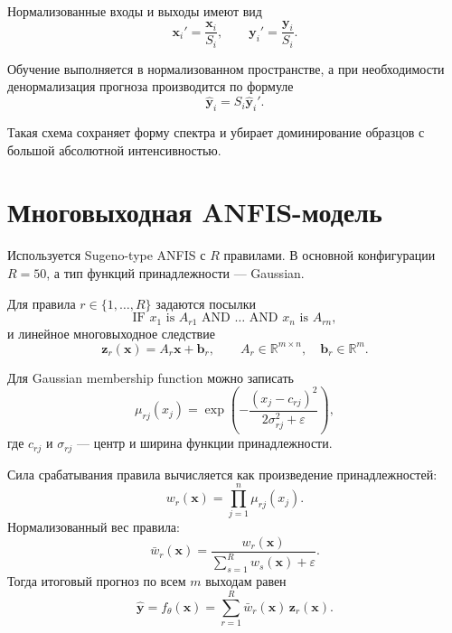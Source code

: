 \documentclass[11pt]{article}
\begin{document}
Нормализованные входы и выходы имеют вид
\begin{equation}
\mathbf{x}_i' = \frac{\mathbf{x}_i}{S_i},
\qquad
\mathbf{y}_i' = \frac{\mathbf{y}_i}{S_i}.
\end{equation}

Обучение выполняется в нормализованном пространстве, а при необходимости денормализация прогноза производится по формуле
\begin{equation}
\hat{\mathbf{y}}_i = S_i \hat{\mathbf{y}}_i'.
\end{equation}

Такая схема сохраняет форму спектра и убирает доминирование образцов с большой абсолютной интенсивностью.

\section{Многовыходная ANFIS-модель}

Используется Sugeno-type ANFIS с $R$ правилами. В основной конфигурации $R=50$, а тип функций принадлежности --- Gaussian.

Для правила $r \in \{1,\dots,R\}$ задаются посылки
\begin{equation}
\text{IF } x_1 \text{ is } A_{r1}
\text{ AND } \dots \text{ AND } x_n \text{ is } A_{rn},
\end{equation}
и линейное многовыходное следствие
\begin{equation}
\mathbf{z}_r(\mathbf{x}) = A_r \mathbf{x} + \mathbf{b}_r,
\qquad
A_r \in \mathbb{R}^{m \times n},
\quad
\mathbf{b}_r \in \mathbb{R}^{m}.
\end{equation}

Для Gaussian membership function можно записать
\begin{equation}
\mu_{rj}(x_j) = \exp\!\left(-\frac{(x_j-c_{rj})^2}{2\sigma_{rj}^2 + \varepsilon}\right),
\end{equation}
где $c_{rj}$ и $\sigma_{rj}$ --- центр и ширина функции принадлежности.

Сила срабатывания правила вычисляется как произведение принадлежностей:
\begin{equation}
 w_r(\mathbf{x}) = \prod_{j=1}^{n} \mu_{rj}(x_j).
\end{equation}
Нормализованный вес правила:
\begin{equation}
\bar{w}_r(\mathbf{x}) = \frac{w_r(\mathbf{x})}{\sum_{s=1}^{R} w_s(\mathbf{x}) + \varepsilon}.
\end{equation}
Тогда итоговый прогноз по всем $m$ выходам равен
\begin{equation}
\hat{\mathbf{y}} = f_{\theta}(\mathbf{x}) = \sum_{r=1}^{R} \bar{w}_r(\mathbf{x}) \, \mathbf{z}_r(\mathbf{x}).
\end{equation}
\end{document}
